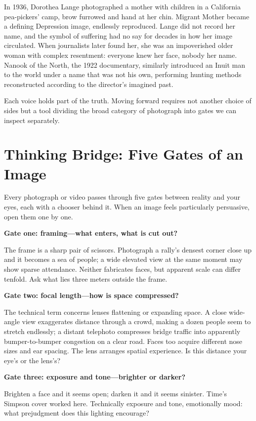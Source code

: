 In 1936, Dorothea Lange photographed a mother with children in a California pea-pickers' camp, brow furrowed and hand at her chin. Migrant Mother became a defining Depression image, endlessly reproduced. Lange did not record her name, and the symbol of suffering had no say for decades in how her image circulated. When journalists later found her, she was an impoverished older woman with complex resentment: everyone knew her face, nobody her name. Nanook of the North, the 1922 documentary, similarly introduced an Inuit man to the world under a name that was not his own, performing hunting methods reconstructed according to the director's imagined past.

Each voice holds part of the truth. Moving forward requires not another choice of sides but a tool dividing the broad category of photograph into gates we can inspect separately.

\section{Thinking Bridge: Five Gates of an Image}
Every photograph or video passes through five gates between reality and your eyes, each with a chooser behind it. When an image feels particularly persuasive, open them one by one.

\textbf{Gate one: framing---what enters, what is cut out?}

The frame is a sharp pair of scissors. Photograph a rally's densest corner close up and it becomes a sea of people; a wide elevated view at the same moment may show sparse attendance. Neither fabricates faces, but apparent scale can differ tenfold. Ask what lies three meters outside the frame.

\textbf{Gate two: focal length---how is space compressed?}

The technical term concerns lenses flattening or expanding space. A close wide-angle view exaggerates distance through a crowd, making a dozen people seem to stretch endlessly; a distant telephoto compresses bridge traffic into apparently bumper-to-bumper congestion on a clear road. Faces too acquire different nose sizes and ear spacing. The lens arranges spatial experience. Is this distance your eye's or the lens's?

\textbf{Gate three: exposure and tone---brighter or darker?}

Brighten a face and it seems open; darken it and it seems sinister. Time's Simpson cover worked here. Technically exposure and tone, emotionally mood: what prejudgment does this lighting encourage?

